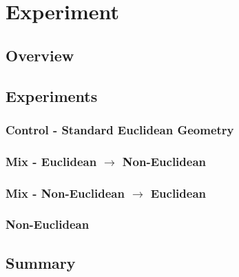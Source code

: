 \chapter{Experiment}
\label{exp}

\section{Overview}

\section{Experiments}
	\subsection{Control - Standard Euclidean Geometry}
	
	
	\subsection{Mix - Euclidean $\rightarrow$ Non-Euclidean}
	
	
	\subsection{Mix - Non-Euclidean $\rightarrow$ Euclidean}
	
	
	\subsection{Non-Euclidean}


\section{Summary}